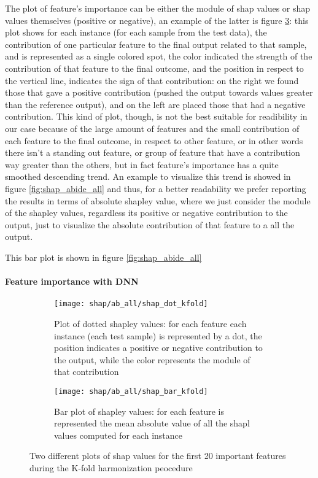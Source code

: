 \documentclass[12pt]{report}
\begin{document}
The plot of feature's importance can be either the module of shap values or shap values themselves (positive or negative), an example of the latter is figure \ref{fig:shap_features_kfold_both}: this plot shows for each instance (for each sample from the test data), the contribution of one particular feature to the final output related to that sample, and is represented as a single colored spot, the color indicated the strength of the contribution of that feature to the final outcome, and the position in respect to the vertical line, indicates the sign of that contribution: on the right we found those that gave a positive contribution (pushed the output towards values greater than the reference output), and on the left are placed those that had a negative contribution.
This kind of plot, though, is not the best suitable for readibility in our case because of the large amount of features and the small contribution of each feature to the final outcome, in respect to other feature, or in other words there isn't a standing out feature, or group of feature that have a contribution way greater than the others, but in fact feature's importance has a quite smoothed descending trend.
An example to visualize this trend is showed in figure \ref{fig:shap_abide_all} and thus, for a better readability we prefer reporting the results in terms of absolute shapley value, where we just consider the module of the shapley values, regardless its positive or negative contribution to the output, just to visualize the absolute contribution of that feature to a all the output.


This bar plot is shown in figure \ref{fig:shap_abide_all}

\paragraph{Feature importance with DNN}


\begin{figure}
\centering
\begin{subfigure}[b]{.45\textwidth}
   \texttt{[image: shap/ab\_all/shap\_dot\_kfold]}
   \caption{Plot of dotted shapley values: for each feature each instance (each test sample) is represented by a dot, the position indicates a positive or negative contribution to the output, while the color represents the module of that contribution}
   \label{}
\end{subfigure}
\begin{subfigure}[b]{.45\textwidth}
   \texttt{[image: shap/ab\_all/shap\_bar\_kfold]}
   \caption{Bar plot of shapley values: for each feature is represented the mean absolute value of all the shapl values computed for each instance}
   \label{}
\end{subfigure}
\caption{Two different plots of shap values for the first 20 important features during the K-fold harmonization peocedure}
\label{fig:shap_features_kfold_both}
\end{figure}
\end{document}

